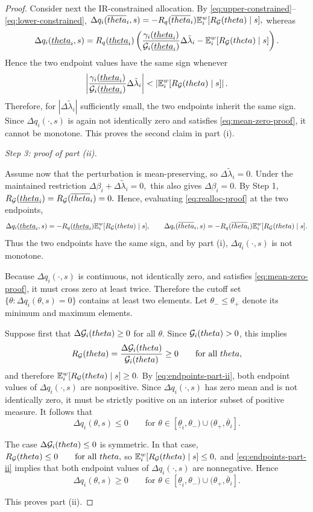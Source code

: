 \documentclass{class}
\begin{document}
\begin{proof}
Consider next the IR-constrained allocation. By \ref{eq:upper-constrained}--\ref{eq:lower-constrained},
$\Delta q_i(\overline{theta}_i,s) = - R_q(\overline{theta}_i)\mathbb{E}_i^w[R_{\mathcal{G}}(theta)\mid s],$
whereas
\[
\Delta q_i(\underline{theta}_i,s)
=
R_q(\underline{theta}_i)
\left(
\frac{\gamma_i(\underline{theta}_i)}{\mathcal{G}_i(\underline{theta}_i)}\Delta\tilde\lambda_i
-
\mathbb{E}_i^w[R_{\mathcal{G}}(theta)\mid s]
\right).
\]
Hence the two endpoint values have the same sign whenever
\[
\left|
\frac{\gamma_i(\underline{theta}_i)}{\mathcal{G}_i(\underline{theta}_i)}
\Delta\tilde\lambda_i
\right|
<
\left|
\mathbb{E}_i^w[R_{\mathcal{G}}(theta)\mid s]
\right|.
\]
Therefore, for $|\Delta\tilde\lambda_i|$ sufficiently small, the two endpoints inherit the same sign. Since $\Delta q_i(\cdot,s)$ is again not identically zero and satisfies \ref{eq:mean-zero-proof}, it cannot be monotone. This proves the second claim in part (i).


\noindent\textit{Step 3: proof of part (ii).}

Assume now that the perturbation is mean-preserving, so $\Delta\tilde\lambda_i=0$. Under the maintained restriction
$\Delta\beta_i+\Delta\tilde\lambda_i=0,$
this also gives $\Delta\beta_i=0$. By Step 1,
$R_{\mathcal{G}}(\underline{theta}_i)=R_{\mathcal{G}}(\overline{theta}_i)=0.$
Hence, evaluating \ref{eq:realloc-proof} at the two endpoints,
\begin{equation}\label{eq:endpoints-part-ii}
\Delta q_i(\underline{theta}_i,s)
=
-
R_q(\underline{theta}_i)\mathbb{E}_i^w[R_{\mathcal{G}}(theta)\mid s],
\qquad
\Delta q_i(\overline{theta}_i,s)
=
-
R_q(\overline{theta}_i)\mathbb{E}_i^w[R_{\mathcal{G}}(theta)\mid s].
\end{equation}
Thus the two endpoints have the same sign, and by part (i), $\Delta q_i(\cdot,s)$ is not monotone.

Because $\Delta q_i(\cdot,s)$ is continuous, not identically zero, and satisfies \ref{eq:mean-zero-proof}, it must cross zero at least twice. Therefore the cutoff set
$\{\theta:\Delta q_i(\theta,s)=0\}$
contains at least two elements. Let $\theta_-\le \theta_+$ denote its minimum and maximum elements.

Suppose first that $\Delta\mathcal{G}_i(theta)\ge 0$ for all $\theta$. Since $\mathcal{G}_i(theta)>0$, this implies
\[
R_{\mathcal{G}}(theta)=\frac{\Delta\mathcal{G}_i(theta)}{\mathcal{G}_i(theta)}\ge 0
\qquad
\text{for all }theta,
\]
and therefore
$\mathbb{E}_i^w[R_{\mathcal{G}}(theta)\mid s]\ge 0.$
By \ref{eq:endpoints-part-ii}, both endpoint values of $\Delta q_i(\cdot,s)$ are nonpositive. Since $\Delta q_i(\cdot,s)$ has zero mean and is not identically zero, it must be strictly positive on an interior subset of positive measure. It follows that
\[
\Delta q_i(\theta,s)\le 0
\qquad
\text{for }\theta\in[\underline\theta_i,\theta_-)\cup(\theta_+,\overline\theta_i].
\]

The case $\Delta\mathcal{G}_i(theta)\le 0$ is symmetric. In that case,
$R_{\mathcal{G}}(theta)\le 0 \qquad\text{for all }theta,$
so
$\mathbb{E}_i^w[R_{\mathcal{G}}(theta)\mid s]\le 0,$
and \ref{eq:endpoints-part-ii} implies that both endpoint values of $\Delta q_i(\cdot,s)$ are nonnegative. Hence
\[
\Delta q_i(\theta,s)\ge 0
\qquad
\text{for }\theta\in[\underline\theta_i,\theta_-)\cup(\theta_+,\overline\theta_i].
\]

This proves part (ii).
\end{proof}
\end{document}

